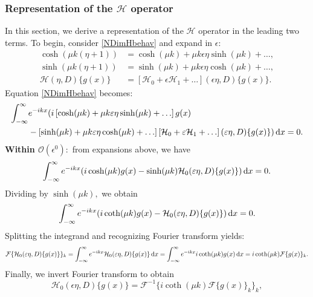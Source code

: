 \documentclass[10pt,reqno,oneside,a4paper]{article}
\begin{document}
\subsubsection{Representation of the $\mathcal{H}$ operator}
In this section, we derive a representation of the $\mathcal{H}$ operator in the leading two terms. To begin, consider \eqref{NDimHbehav} and expand in $\epsilon:$
\begin{align*}
\cosh(\mu k(\eta+1)) &= \cosh(\mu k) + \mu k \epsilon \eta \sinh(\mu k) + \ldots, \\
\sinh(\mu k(\eta+1)) &= \sinh(\mu k) + \mu k \epsilon \eta \cosh(\mu k) + \ldots, \\
\mathcal{H}( \eta, D)\{ g(x) \} &= \left[\mathcal{H}_0 + \epsilon \mathcal{H}_1 + \ldots \right]( \epsilon\eta, D)\{ g(x) \}.
\end{align*}
Equation \eqref{NDimHbehav} becomes:
\begin{align*}
\int_{-\infty}^{\infty} &e^{-ikx}( i \left[ \cosh(\mu k) + \mu k \varepsilon \eta \sinh(\mu k) + \ldots \right] g(x) \\
&- \left[ \sinh(\mu k) + \mu k \varepsilon \eta \cosh(\mu k) + \ldots\right] \left[ \mathcal{H}_0 + \varepsilon \mathcal{H}_1 + \ldots \right]( \varepsilon \eta, D)\{ g(x) \}) \,\mathrm{d} x = 0.
\end{align*}
\textbf{Within $\mathcal{O}(\epsilon^0):$} from expansions above, we have 
\begin{equation*}
\int_{-\infty}^{\infty} e^{-ikx}( i  \cosh(\mu k) g(x) - \sinh(\mu k) \mathcal{H}_0( \varepsilon \eta, D)\{ g(x) \}) \,\mathrm{d} x = 0.
\end{equation*}
Dividing by $\sinh(\mu k),$ we obtain 
\begin{equation*}
\int_{-\infty}^{\infty} e^{-ikx}( i  \coth(\mu k) g(x) - \mathcal{H}_0( \varepsilon \eta, D)\{ g(x) \}) \,\mathrm{d} x = 0.
\end{equation*}
Splitting the integrand and recognizing Fourier transform yields:
\begin{equation*}
\mathcal{F}\{\mathcal{H}_0( \varepsilon \eta, D)\{ g(x) \}\}_k= \int_{-\infty}^{\infty} e^{-ikx}\mathcal{H}_0( \varepsilon \eta, D)\{ g(x) \} \,\mathrm{d} x = \int_{-\infty}^{\infty} e^{-ikx} i \coth(\mu k) g(x) \,\mathrm{d} x = i \coth(\mu k) \mathcal{F}\{g(x)\}_k.
\end{equation*}
Finally, we invert Fourier transform to obtain 
\begin{equation*}
\mathcal{H}_0( \epsilon \eta, D)\{ g(x) \} =\mathcal{F}^{-1}\{i \coth(\mu k) \mathcal{F}\{g(x)\}_k \}_k,
\end{equation*}
\end{document}
